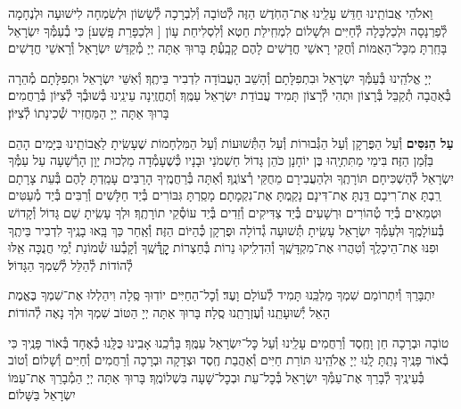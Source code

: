 \documentclass[twoside, openany, parskip=half, 11pt]{book}
\begin{document}
וֵאלֹהֵי אֲבוֹתֵֽינוּ חַדֵּשׁ עָלֵֽינוּ אֶת־הַחֹֽדֶשׁ הַזֶּה לְ֯טוֹבָה וְ֯לִבְרָכָה לְ֯שָׂשׂוֹן וּלְשִׂמְחָה לִישׁוּעָה וּלְנֶחָמָה לְ֯פַרְנָסָה וּלְכַלְכָּלָה לְ֯חַיִּים וּלְשָׁלוֹם לִמְחִֽילַת חֵטְא וְ֯לִסְלִיחַת עָוֹן [
וּלְכַפָּרַת פָּֽשַׁע]׃ כִּי בְ֯עַמְּ֯ךָ יִשְׂרָאֵל בָּחַֽרְתָּ מִכׇּל־הָאֻמּוֹת וְ֯חֻקֵּי רָאשֵׁי חֳדָשִׁים לָהֶם קָבָֽעְ֯תָּ׃ בָּרוּךְ אַתָּה יְיָ מְ֯קַדֵּשׁ יִשְׂרָאֵל וְ֯רָאשֵׁי חֳדָשִׁים׃

יְיָ אֱלֹהֵֽינוּ בְּ֯עַמְּ֯ךָ יִשְׂרָאֵל וּבִתְפִלָּתָם וְ֯הָשֵׁב הָעֲבוֹדָה לִדְבִיר בֵּיתֶֽךָ׃ וְ֯אִשֵּׁי יִשְׂרָאֵל וּתְפִלָּתָם מְ֯הֵרָה בְּ֯אַהֲבָה תְ֯קַבֵּל בְּ֯רָצוֹן וּתְהִי לְ֯רָצוֹן תָּמִיד עֲבוֹדַת יִשְׂרָאֵל עַמֶּֽךָ׃ וְ֯תֶחֱזֶֽינָה עֵינֵֽינוּ בְּ֯שׁוּבְ֯ךָ לְ֯צִיּוֹן בְּ֯רַחֲמִים׃ בָּרוּךְ אַתָּה יְיָ הַמַּחֲזִיר שְׁ֯כִינָתוֹ לְ֯צִיּוֹן׃

\modim

\enlargethispage{\baselineskip}

\begin{sometimes}

\textbf{עַל הַנִּסִּים}
וְ֯עַל הַפֻּרְקָן וְ֯עַל הַגְּ֯בוּרוֹת וְ֯עַל הַתְּ֯שׁוּעוֹת וְ֯עַל הַמִּלְחָמוֹת
שֶׁעָשִֽׂיתָ לַאֲבוֹתֵֽינוּ בַּיָּמִים הָהֵם בַּזְּ֯מַן הַזֶּה׃
בִּימֵי מַתִּתְיָֽהוּ בֶּן יוֹחָנָן כֹּהֵן גָּדוֹל חַשְׁמֹנַי וּבָנָיו כְּ֯שֶׁעָמְ֯דָה מַלְכוּת יָוָן הָרְ֯שָׁעָה עַל עַמְּ֯ךָ יִשְׂרָאֵל לְ֯הַשְׁכִּיחָם תּוֹרָתֶֽךָ וּלְהַעֲבִירָם מֵחֻקֵּי רְ֯צוֹנֶֽךָ׃ וְ֯אַתָּה בְּ֯רַחֲמֶֽיךָ הָרַבִּים עָמַֽדְתָּ לָהֶם בְּ֯עֵת צָרָתָם רַֽבְתָּ אֶת־רִיבָם דַּֽנְתָּ אֶת־דִּינָם נָקַֽמְתָּ אֶת־נִקְמָתָם׃ מָסַֽרְתָּ גִּבּוֹרִים בְּ֯יַד חַלָּשִׁים וְ֯רַבִּים בְּ֯יַד מְ֯עַטִּים וּטְמֵאִים בְּ֯יַד טְ֯הוֹרִים וּרְשָׁעִים בְּ֯יַד צַדִּיקִים וְ֯זֵדִים בְּ֯יַד עוֹסְ֯קֵי תוֹרָתֶֽךָ׃ וּלְךָ עָשִֽׂיתָ שֵׁם גָּדוֹל וְ֯קָדוֹשׁ בְּ֯עוֹלָמֶֽךָ וּלְעַמְּ֯ךָ יִשְׂרָאֵל עָשִֽׂיתָ תְּ֯שׁוּעָה גְ֯דוֹלָה וּפֻרְקָן כְּ֯הַיּוֹם הַזֶּה׃ וְ֯אַֽחַר כַּךְ בָּֽאוּ בָנֶֽיךָ לִדְבִיר בֵּיתֶֽךָ וּפִנּוּ אֶת־הֵיכָלֶֽךָ וְ֯טִהֲרוּ אֶת־מִקְדָּשֶֽׁךָ וְ֯הִדְלִֽיקוּ נֵרוֹת בְּ֯חַצְרוֹת קׇׇׇׇׇׇׇדְּ֯שֶֽׁךָ וְ֯קָבְ֯עוּ שְׁ֯מוֹנַת יְ֯מֵי חֲנֻכָּה אֵֽלּוּ לְ֯הוֹדוֹת לְ֯הַלֵּל לְ֯שִׁמְךָ הַגָּדוֹל׃

\end{sometimes}

\nextpage

יִתְבָּרַךְ וְ֯יִתְרוֹמַם שִׁמְךָ מַלְכֵּֽנוּ תָּמִיד לְ֯עוֹלָם וָעֶד׃
וְ֯כׇל־הַחַיִּים יוֹדֽוּךָ סֶּֽלָה וִיהַלְלוּ אֶת־שִׁמְךָ בֶּאֱמֶת הָאֵל יְ֯שׁוּעָתֵֽנוּ וְ֯עֶזְרָתֵֽנוּ סֶֽלָה׃ בָּרוּךְ אַתָּה יְיָ הַטּוֹב שִׁמְךָ וּלְךָ נָאֶה לְ֯הוֹדוֹת׃

\shatzbrikaskohanim

טוֹבָה וּבְרָכָה חֵן וָחֶֽסֶד וְ֯רַחֲמִים עָלֵֽינוּ וְ֯עַל כׇּל־יִשְׂרָאֵל עַמֶּֽךָ׃ בָּרְ֯כֵֽנוּ אָבִֽינוּ כֻּלָּֽנוּ כְּ֯אֶחָד בְּ֯אוֹר פָּנֶֽיךָ כִּי בְ֯אוֹר פָּנֶֽיךָ נָתַֽתָּ לָֽנוּ יְיָ אֱלֹהֵֽינוּ תּוֹרַת חַיִּים וְ֯אַהֲבַת חֶֽסֶד וּצְדָקָה וּבְרָכָה וְ֯רַחֲמִים וְ֯חַיִּים וְ֯שָׁלוֹם׃ וְ֯טוֹב בְּ֯עֵינֶֽיךָ לְ֯בָרֵךְ אֶת־עַמְּ֯ךָ יִשְׂרָאֵל בְּ֯כׇל־עֵת וּבְכׇל־שָׁעָה בִּשְׁלוֹמֶֽךָ׃ בָּרוּךְ אַתָּה יְיָ הַמְ֯בָרֵךְ אֶת־עַמּוֹ יִשְׂרָאֵל בַּשָּׁלוֹם׃
\end{document}
